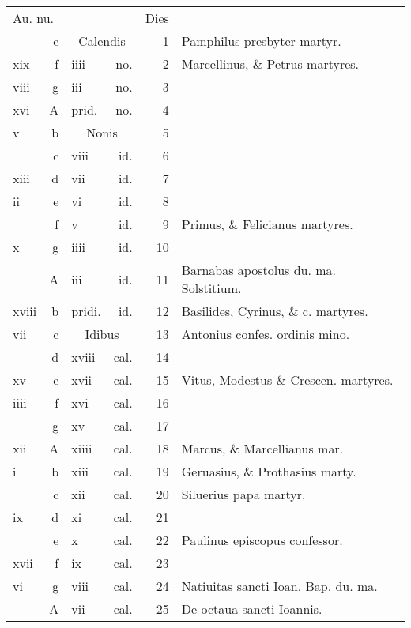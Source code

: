 \documentclass[a5paper,10pt]{book}
\begin{document}
\begin{center}
\begin{tabular}{l r l r r l}
\multicolumn{2}{l}{\color{red}Au. nu.} & & & \color{red} Dies & \\
 & e & \multicolumn{2}{c}{\color{red} Calendis} & 1 & Pamphilus presbyter martyr. \color{black} \\
xix & f & iiii & no. & 2 & Marcellinus, \& Petrus martyres. \color{black} \\
viii & g & iii & no. & 3 & \\
xvi & \color{red} A & \color{red} prid. & \color{red} no. & 4 & \\
v & b & \multicolumn{2}{c}{\color{red} Nonis} & 5 & \\
 & c & viii & id. & 6 & \\
xiii & d & vii & id. & 7 & \\
ii & e & vi & id. & 8 & \\
 & f & v & id. & 9 & Primus, \& Felicianus martyres. \\
x & g & iiii & id. & 10 & \\
 & \color{red} A & iii & id. & 11 & \color{red} Barnabas apostolus du. ma. Solstitium. \color{black} \\
xviii & b & \color{red} pridi. & \color{red} id. & 12 & Basilides, Cyrinus, \& c. martyres. \color{black}\\
vii & c & \multicolumn{2}{c}{\color{red} Idibus} & 13 & Antonius confes. ordinis mino. \color{black} \\
 & d & xviii & cal. & 14 & \\
xv & e & xvii & cal. & 15 & Vitus, Modestus \& Crescen. martyres.\\
iiii & f & xvi & cal. & 16 & \\
 & g & xv & cal. & 17 & \\
xii & \color{red} A & xiiii & cal. & 18 & Marcus, \& Marcellianus mar. \\
i & b & xiii & cal. & 19 & Geruasius, \& Prothasius marty. \color{black} \\
 & c & xii & cal. & 20 & Siluerius papa martyr. \\
ix & d & xi & cal. & 21 & \\
 & e & x & cal. & 22 & Paulinus episcopus confessor. \\
xvii & f & ix & cal. & 23 & \\
vi & g & viii & cal. & 24 & \color{red} Natiuitas sancti Ioan. Bap. du. ma. \color{black} \\
 & \color{red} A & vii & cal. & 25 & De octaua sancti Ioannis. \color{black} \\

\end{tabular}
\end{center}
\end{document}
